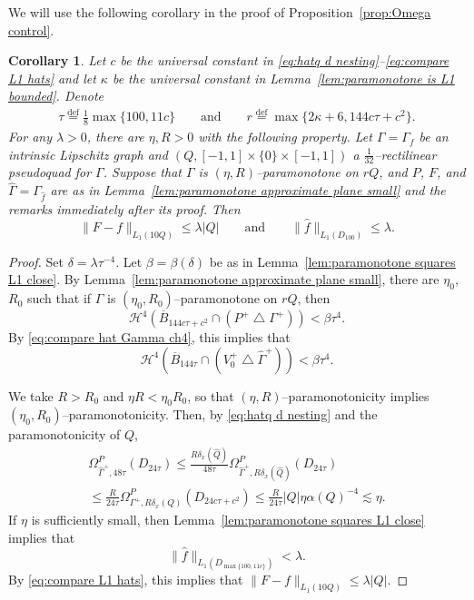 \documentclass[11pt,reqno]{amsart}
\newcommand{\cH}{\mathcal{H}}
\newcommand{\0}{\mathbf{0}}
\renewcommand{\1}{\mathbf 1}
\newcommand{\symdiff}{\mathbin{\triangle}}
\newcommand{\eqdef}{\stackrel{\mathrm{def}}{=}}
\renewcommand{\le}{\leqslant}
\newtheorem{cor}[thm]{Corollary}
\theoremstyle{remark}
\begin{document}
We will use the following corollary in the proof of Proposition~\ref{prop:Omega control}.
\begin{cor}\label{cor:omega L1 bounds}
  Let $c$ be the universal constant in \eqref{eq:hatq d nesting}--\eqref{eq:compare L1 hats} and let $\kappa$ be the universal constant in Lemma~\ref{lem:paramonotone is L1 bounded}.  Denote
  \begin{align*}
    \tau \eqdef \frac{1}{8} \max\{100, 11c\}\qquad\mathrm{and}\qquad
    r  \eqdef  \max\big\{2 \kappa+6, 144 c \tau +c^2\big \}.
  \end{align*}
  For any $\lambda>0$, there are $\eta, R>0$ with the following property. Let $\Gamma=\Gamma_f$ be an intrinsic Lipschitz graph and $(Q, [-1,1]\times \{0\}\times [-1,1])$ a $\frac{1}{32}$--rectilinear pseudoquad for $\Gamma$. Suppose that $\Gamma$ is $(\eta, R)$--paramonotone on $rQ$, and $P$, $F$, and $\hat{\Gamma}=\Gamma_{\hat{f}}$ are as in Lemma~\ref{lem:paramonotone approximate plane small} and the remarks immediately  after its proof.  Then
  $$\|F-f\|_{L_1(10 Q)} \le \lambda |Q|\qquad \mathrm{and}\qquad \|\hat{f}\|_{L_1(D_{100})} \le \lambda.$$
\end{cor}
\begin{proof}
  Set $\delta = \lambda \tau^{-4}$.  Let $\beta=\beta(\delta)$ be as in Lemma~\ref{lem:paramonotone squares L1 close}.  By Lemma~\ref{lem:paramonotone approximate plane small}, there are $\eta_0$, $R_0$ such that if $\Gamma$ is $(\eta_0, R_0)$--paramonotone on $rQ$, then
  $$\cH^4\left(\overline{B}_{144 c \tau +c^2} \cap (P^+\symdiff \Gamma^+)\right)<\beta \tau^4.$$
  By \eqref{eq:compare hat Gamma ch4}, this implies that
  $$\cH^4\left(\overline{B}_{144 \tau} \cap (V_0^+\symdiff \hat{\Gamma}^+)\right)<\beta \tau^4.$$

  We take $R>R_0$ and $\eta R<\eta_0 R_0$, so that $(\eta, R)$--para\-monotonicity implies $(\eta_0,R_0)$--para\-monotonicity.
  Then, by \eqref{eq:hatq d nesting} and the paramonotonicity of $Q$,
  \begin{multline*}
  \Omega^P_{\hat{\Gamma}^+,48\tau}(D_{24\tau}) \le \frac{R \delta_x(\hat{Q})}{48\tau}\Omega^P_{\hat{\Gamma}^+,R \delta_x(\hat{Q})}(D_{24\tau}) \\\le \frac{R}{24\tau}\Omega^P_{\Gamma^+,R \delta_x(Q)}(D_{24c\tau+c^2}) \le \frac{R}{24\tau} |Q| \eta\alpha(Q)^{-4} \lesssim \eta.\end{multline*}
  If $\eta$ is sufficiently small, then Lemma~\ref{lem:paramonotone squares L1 close} implies that
  $$\|\hat{f}\|_{L_1(D_{\max\{100, 11c\}})} < \lambda.$$
  By \eqref{eq:compare L1 hats}, this implies that $\|F-f\|_{L_1(10 Q)} \le \lambda |Q|$.
\end{proof}
\end{document}
